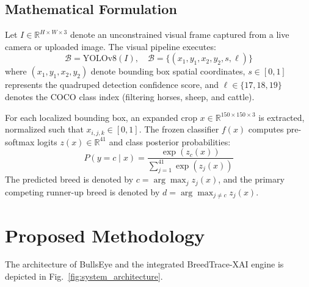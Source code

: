 \documentclass[conference]{IEEEtran}
\begin{document}
\subsection{Mathematical Formulation}
Let $I \in \mathbb{R}^{H \times W \times 3}$ denote an unconstrained visual frame captured from a live camera or uploaded image. The visual pipeline executes:
\begin{equation}
\mathcal{B} = \text{YOLOv8}(I), \quad \mathcal{B} = \{(x_1, y_1, x_2, y_2, s, \ell)\}
\end{equation}
where $(x_1, y_1, x_2, y_2)$ denote bounding box spatial coordinates, $s \in [0, 1]$ represents the quadruped detection confidence score, and $\ell \in \{17, 18, 19\}$ denotes the COCO class index (filtering horses, sheep, and cattle).

For each localized bounding box, an expanded crop $x \in \mathbb{R}^{150 \times 150 \times 3}$ is extracted, normalized such that $x_{i,j,k} \in [0, 1]$. The frozen classifier $f(x)$ computes pre-softmax logits $z(x) \in \mathbb{R}^{41}$ and class posterior probabilities:
\begin{equation}
P(y = c \mid x) = \frac{\exp(z_c(x))}{\sum_{j=1}^{41} \exp(z_j(x))}
\end{equation}
The predicted breed is denoted by $c = \arg\max_{j} z_j(x)$, and the primary competing runner-up breed is denoted by $d = \arg\max_{j \neq c} z_j(x)$.

\section{Proposed Methodology}

The architecture of BullsEye and the integrated BreedTrace-XAI engine is depicted in Fig.~\ref{fig:system_architecture}.
\end{document}
